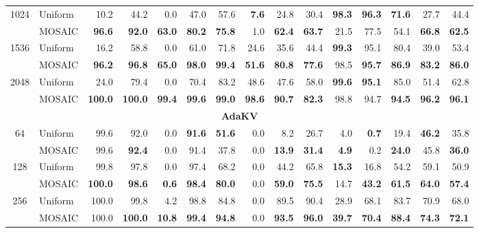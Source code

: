 \begin{table}[tp]
\begin{tabular}{@{} c l rrrrrrrrrrrrr @{}}
    \cmidrule(l){1-15}
    \multirow{2}{*}{1024} & Uniform & 10.2 & 44.2 & 0.0 & 47.0 & 57.6 & \textbf{7.6} & 24.8 & 30.4 & \textbf{98.3} & \textbf{96.3} & \textbf{71.6} & 27.7 & 44.4 \\
     & MOSAIC & \textbf{96.6} & \textbf{92.0} & \textbf{63.0} & \textbf{80.2} & \textbf{75.8} & 1.0 & \textbf{62.4} & \textbf{63.7} & 21.5 & 77.5 & 54.1 & \textbf{66.8} & \textbf{62.5} \\
    \cmidrule(l){1-15}
    \multirow{2}{*}{1536} & Uniform & 16.2 & 58.8 & 0.0 & 61.0 & 71.8 & 24.6 & 35.6 & 44.4 & \textbf{99.3} & 95.1 & 80.4 & 39.0 & 53.4 \\
     & MOSAIC & \textbf{96.2} & \textbf{96.8} & \textbf{65.0} & \textbf{98.0} & \textbf{99.4} & \textbf{51.6} & \textbf{80.8} & \textbf{77.6} & 98.5 & \textbf{95.7} & \textbf{86.9} & \textbf{83.2} & \textbf{86.0} \\
    \cmidrule(l){1-15}
    \multirow{2}{*}{2048} & Uniform & 24.0 & 79.4 & 0.0 & 70.4 & 83.2 & 48.6 & 47.6 & 58.0 & \textbf{99.6} & \textbf{95.1} & 85.0 & 51.4 & 62.8 \\
     & MOSAIC & \textbf{100.0} & \textbf{100.0} & \textbf{99.4} & \textbf{99.6} & \textbf{99.0} & \textbf{98.6} & \textbf{90.7} & \textbf{82.3} & 98.8 & 94.7 & \textbf{94.5} & \textbf{96.2} & \textbf{96.1} \\
    \midrule
    \multicolumn{15}{c}{\textbf{AdaKV}} \\
    \midrule
    \multirow{2}{*}{64} & Uniform & 99.6 & 92.0 & 0.0 & \textbf{91.6} & \textbf{51.6} & 0.0 & 8.2 & 26.7 & 4.0 & \textbf{0.7} & 19.4 & \textbf{46.2} & 35.8 \\
     & MOSAIC & 99.6 & \textbf{92.4} & 0.0 & 91.4 & 37.8 & 0.0 & \textbf{13.9} & \textbf{31.4} & \textbf{4.9} & 0.2 & \textbf{24.0} & 45.8 & \textbf{36.0} \\
    \cmidrule(l){1-15}
    \multirow{2}{*}{128} & Uniform & 99.8 & 97.8 & 0.0 & 97.4 & 68.2 & 0.0 & 44.2 & 65.8 & \textbf{15.3} & 16.8 & 54.2 & 59.1 & 50.9 \\
     & MOSAIC & \textbf{100.0} & \textbf{98.6} & \textbf{0.6} & \textbf{98.4} & \textbf{80.0} & 0.0 & \textbf{59.0} & \textbf{75.5} & 14.7 & \textbf{43.2} & \textbf{61.5} & \textbf{64.0} & \textbf{57.4} \\
    \cmidrule(l){1-15}
    \multirow{2}{*}{256} & Uniform & 100.0 & 99.8 & 4.2 & 98.8 & 84.8 & 0.0 & 89.5 & 90.4 & 28.9 & 68.1 & 83.7 & 70.9 & 68.0 \\
     & MOSAIC & 100.0 & \textbf{100.0} & \textbf{10.8} & \textbf{99.4} & \textbf{94.8} & 0.0 & \textbf{93.5} & \textbf{96.0} & \textbf{39.7} & \textbf{70.4} & \textbf{88.4} & \textbf{74.3} & \textbf{72.1} \\

\end{tabular}
\end{table}

